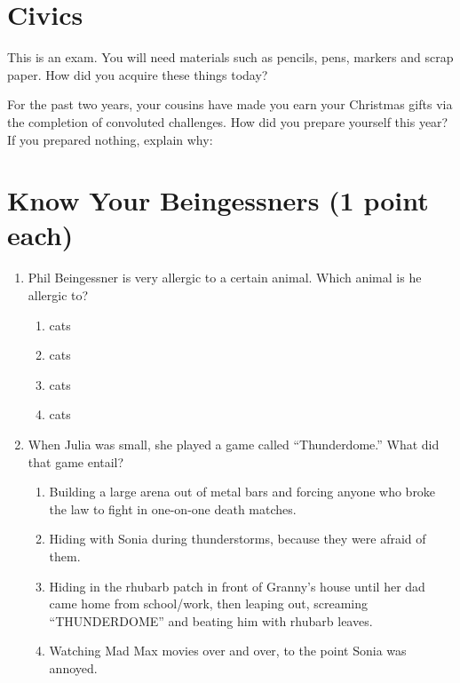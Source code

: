 \documentclass[11pt]{exam}
\begin{document}
\begin{questions}




\newpage
\section{Civics}
\addpoints

\question[5] This is an exam. You will need materials such as pencils, pens,
markers and scrap paper. How did you acquire these things today?
\vfill

\question[5] For the past two years, your cousins have made you earn your
Christmas gifts via the completion of convoluted challenges. How did you prepare
yourself this year? If you prepared nothing, explain why:
\vfill





\newpage
\section{Know Your Beingessners (1 point each)}

\begin{enumerate}
\item Phil Beingessner is very allergic to a certain animal. Which animal is he allergic to?

\begin{enumerate}
\item cats
\item cats
\item cats
\item cats
\end{enumerate}



\item When Julia was small, she played a game called ``Thunderdome.'' What did that game entail?

\begin{enumerate}
\item Building a large arena out of metal bars and forcing anyone who broke the law to fight in one-on-one death matches.
\item Hiding with Sonia during thunderstorms, because they were afraid of them.
\item Hiding in the rhubarb patch in front of Granny’s house until her dad came home from
school/work, then leaping out, screaming ``THUNDERDOME'' and beating him with
rhubarb leaves.
\item Watching Mad Max movies over and over, to the point Sonia was annoyed.
\end{enumerate}




\end{enumerate}
\end{questions}
\end{document}

